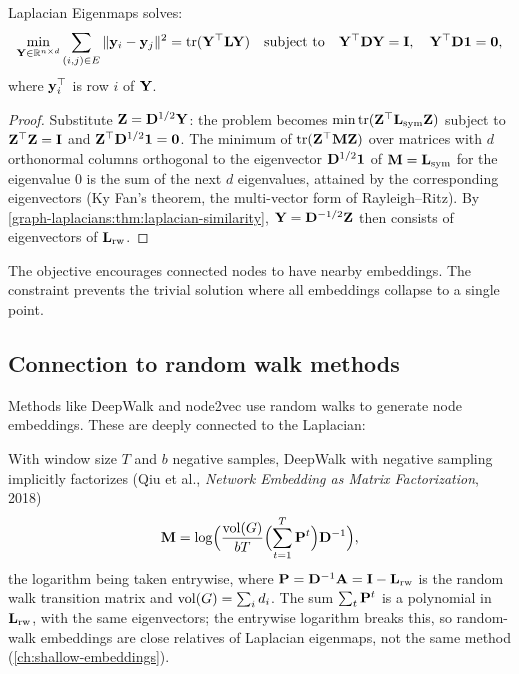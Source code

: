 \begin{notechapter}
\begin{theorem}\label{graph-laplacians:thm:eigenmaps-optimal}
Laplacian Eigenmaps solves:
\begin{equation}
\min_{\mathbf{Y} \in \mathbb{R}^{n \times d}} \sum_{(i,j) \in E} \| \mathbf{y}_i - \mathbf{y}_j \|^2 = \operatorname{tr}(\mathbf{Y}^\top\mathbf{L}\mathbf{Y}) \quad \text{subject to} \quad \mathbf{Y}^\top \mathbf{D} \mathbf{Y} = \mathbf{I},\quad\mathbf{Y}^\top\mathbf{D}\mathbf{1} = \mathbf 0,
\end{equation}
where $\mathbf{y}_i^\top$ is row $i$ of $\mathbf{Y}$.
\end{theorem}

\begin{proof}
Substitute $\mathbf{Z} = \mathbf{D}^{1/2}\mathbf{Y}$: the problem becomes $\min\operatorname{tr}(\mathbf{Z}^\top\mathbf{L}_{\text{sym}}\mathbf{Z})$ subject to $\mathbf{Z}^\top\mathbf{Z} = \mathbf{I}$ and $\mathbf{Z}^\top\mathbf{D}^{1/2}\mathbf{1} = \mathbf 0$. The
minimum of $\operatorname{tr}(\mathbf{Z}^\top\mathbf{M}\mathbf{Z})$ over matrices with $d$ orthonormal columns orthogonal to the eigenvector $\mathbf{D}^{1/2}\mathbf{1}$ of
$\mathbf{M} = \mathbf{L}_{\text{sym}}$ for the eigenvalue $0$ is the sum of the next $d$ eigenvalues, attained by the corresponding
eigenvectors (Ky Fan's theorem, the multi-vector form of Rayleigh--Ritz). By
\cref{graph-laplacians:thm:laplacian-similarity}, $\mathbf{Y} = \mathbf{D}^{-1/2}\mathbf{Z}$ then consists of eigenvectors of $\mathbf{L}_{\text{rw}}$.
\end{proof}

\begin{intuition}
The objective encourages connected nodes to have nearby embeddings. The constraint prevents the trivial solution where all embeddings collapse to a single point.
\end{intuition}

\subsection{Connection to random walk methods}

Methods like DeepWalk and node2vec use random walks to generate node embeddings. These are deeply connected to the Laplacian:

\begin{keyidea}
With window size $T$ and $b$ negative samples, DeepWalk with negative sampling implicitly factorizes
(Qiu et al., \emph{Network Embedding as Matrix Factorization}, 2018)
\begin{equation}
\mathbf{M} = \log\Bigl(\frac{\mathrm{vol}(G)}{bT}\Bigl(\sum_{t=1}^{T}\mathbf{P}^t\Bigr)\mathbf{D}^{-1}\Bigr),
\end{equation}
the logarithm being taken entrywise, where $\mathbf{P} = \mathbf{D}^{-1}\mathbf{A} = \mathbf{I} - \mathbf{L}_{\text{rw}}$ is the random walk transition matrix and
$\mathrm{vol}(G) = \sum_id_i$. The sum $\sum_t\mathbf{P}^t$ is a polynomial in $\mathbf{L}_{\text{rw}}$, with the same eigenvectors; the entrywise logarithm
breaks this, so random-walk embeddings are close relatives of Laplacian eigenmaps, not the same
method (\cref{ch:shallow-embeddings}).
\end{keyidea}


\end{notechapter}
